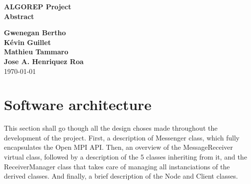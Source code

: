 \documentclass[11pt]{article}
\begin{document}
\begin{titlepage}
  \begin{center}
    \vspace*{1cm} \Huge \textbf{ALGOREP Project}\\
    \vspace*{2\baselineskip} \large \textbf{Abstract}
    \vspace*{2\baselineskip}
  \end{center}
  \begin{center}
    \vfill\normalsize \textbf{Gwenegan Bertho}\\ \normalsize \textbf{Kévin
      Guillet}\\ \normalsize \textbf{Mathieu Tammaro}\\ \normalsize \textbf{Jose
      A. Henriquez Roa}\\
    \vspace*{2\baselineskip} \today \rhead{\today}
    \newpage
    \normalsize \tableofcontents
    \newpage
  \end{center}
\end{titlepage}
\section{Software architecture}
This section shall go though all the design choses made throughout the
development of the project. First, a description of Messenger class, which fully
encapsulates the Open MPI API. Then, an overview of the MessageReceiver virtual
class, followed by a description of the 5 classes inheriting from it, and the
ReceiverManager class that takes care of managing all instanciations of the
derived classes. And finally, a brief description of the Node and Client
classes.
\end{document}
